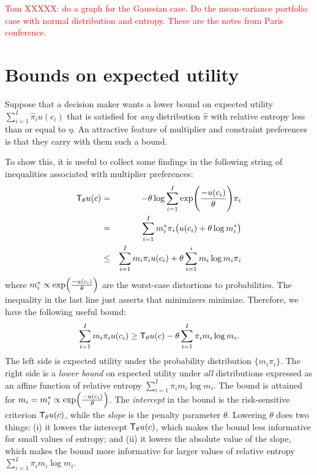 \textcolor{red}{Tom XXXXX: do a graph for the Gaussian case. Do the mean-variance portfolio case with normal distribution and entropy. These
are the notes from Paris conference.}
\section{Bounds on expected utility\label{sec:bounds}}


Suppose that a  decision maker %
wants a lower bound on expected  utility $\sum_{i=1}^I  \hat \pi_i u(c_i)$ %
that is satisfied for {\em any} distribution $\hat \pi$ with
relative entropy less than or equal to $\eta$.
An attractive feature of multiplier and constraint preferences is that they carry with them such a bound.

To show this, it is useful to collect some findings in the following string of inequalities associated with multiplier preferences:
\begin{eqnarray}
{\sf T}_\theta u(c) & = & -\theta \log \sum_{i=1}^I \exp\Biggl(\frac{-u(c_i)}{\theta}\Biggr) \pi_i \nonumber \\
    & = & \sum_{i=1}^I m_i^* \pi_i \bigl( u(c_i) + \theta \log m_i^* \bigr) \nonumber \\
    & \leq & \sum_{i=1}^I m_i \pi_i u(c_i) + \theta \sum_{i=1}^i m_i \log m_i \pi_i \end{eqnarray}
where $m_i^* \propto \exp \Bigl( \frac{- u(c_i)}{\theta} \Bigr) $ are the  worst-case distortions to  probabilities.
The inequality in the last line just asserts that minimizers minimize.  
Therefore, we have the following useful  bound:
\begin{equation}\label{eqn:bound1} \sum_{i=1}^I m_i \pi_i u(c_i ) \geq {\sf T}_\theta u(c) - \theta \sum_{i=1}^I \pi_i m_i \log m_i .\end{equation}
The left side is expected utility under the probability distribution $\{ m_i \pi_i\}$.  
The right side is a {\em lower bound} on expected utility under {\em all} distributions %
expressed as an affine function
of relative entropy $\sum_{i=1}^I \pi_i m_i \log m_i$.  The bound is attained for $m_i =  m_i^* \propto \exp \Bigl(\frac{- u (c_i)}{\theta} \Bigr)$.  The {\em intercept} 
in the bound is the risk-sensitive criterion
${\sf T}_\theta u(c)$, while the {\em slope} is the penalty parameter $\theta$.  Lowering $\theta$ does two things: (i) it lowers the intercept ${\sf T}_\theta u(c)$, which makes the
bound less informative for small values of entropy;
and (ii) it lowers the absolute value of the slope, which makes the bound more informative for larger values of relative entropy $\sum_{i=1}^I \pi_i m_i \log m_i$.


